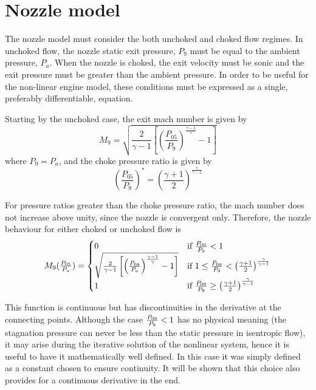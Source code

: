 \documentclass[tcc]{subfiles}
\begin{document}
\section{Nozzle model}
The nozzle model must consider the both unchoked and choked flow regimes. 
In unchoked flow, the nozzle static exit pressure, $P_9$ must be equal to the ambient pressure, $P_a$. 
When the nozzle is choked, the exit velocity must be sonic 
and the exit pressure must be greater than the ambient pressure.
In order to be useful for the non-linear engine model, these conditions must be expressed as a single, preferably differentiable, equation. 

Starting by the unchoked case, the exit mach number is given by
\begin{equation}
    M_9 = \sqrt{\frac{2}{\gamma-1}\left[\left(\frac{P_{05}}{P_9}\right)^{\frac{\gamma-1}{\gamma}}-1\right]}
\end{equation}
where $P_9=P_a$, and the choke pressure ratio is given by
\begin{equation}
    \left(\frac{P_{05}}{P_9}\right)^* = \left(\frac{\gamma+1}{2}\right)^\frac{\gamma}{\gamma-1}
\end{equation}

For pressure ratios greater than the choke pressure ratio, the mach number does not increase above unity, 
since the nozzle is convergent only. Therefore, the nozzle behaviour for either choked or unchoked flow is
\begin{equation}
    \label{eqn:M9}
    M_9(\tfrac{P_{05}}{P_a}) = \begin{cases}
        0 &\text{if $\frac{P_{09}}{P_{9}} < 1$} \\
        \sqrt{\frac{2}{\gamma-1}\left[\left(\frac{P_{09}}{P_a}\right)^{\frac{\gamma-1}{\gamma}}-1\right]} 
        &\text{if $1 \leq \frac{P_{09}}{P_{9}} <\left(\frac{\gamma+1}{2}\right)^\frac{\gamma}{\gamma-1}$} \\
        1 & \text{if $\frac{P_{09}}{P_{9}} \geq \left(\frac{\gamma+1}{2}\right)^\frac{\gamma}{\gamma-1}$ }
    \end{cases}
\end{equation}


This function is continuous but has discontinuities in the derivative at the connecting points. 
Although the case $\frac{P_{09}}{P_{9}}<1$ has no physical meaning 
(the stagnation pressure can never be less than the static pressure in isentropic flow), 
it may arise during the iterative solution of the nonlinear system, 
hence it is useful to have it mathematically well defined. 
In this case it was simply defined as a constant chosen to ensure continuity. It will be shown that this choice also provides for a continuous derivative in the end.
\end{document}
